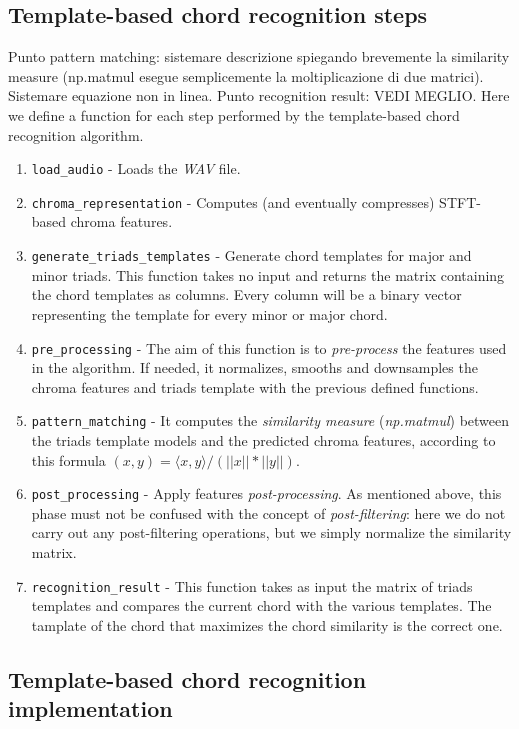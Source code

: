 \documentclass[
	12pt, %
]{fphw}
\begin{document}
\subsection*{Template-based chord recognition steps}

\color{red}
Punto pattern matching: sistemare descrizione spiegando brevemente la similarity measure (np.matmul esegue semplicemente la moltiplicazione di due matrici). Sistemare equazione non in linea.
Punto recognition result: VEDI MEGLIO.
\color{black}
Here we define a function for each step performed by the template-based chord recognition algorithm.

\begin{enumerate}
	\item \verb|load_audio| - Loads the \emph{WAV} file.
	\item \verb|chroma_representation| - Computes (and eventually compresses) STFT-based chroma features.
	\item \verb|generate_triads_templates| - Generate chord templates for major and minor triads. This function takes no input and returns the matrix containing the chord templates as columns. Every column will be a binary vector representing the template for every minor or major chord.
	\item \verb|pre_processing| - The aim of this function is to \emph{pre-process} the features used in the algorithm. If needed, it normalizes, smooths and downsamples the chroma features and triads template with the previous defined functions.
	\item \verb|pattern_matching| - It computes the \textit{similarity measure} (\textit{np.matmul}) between the triads template models and the predicted chroma features, according to this formula $(x,y)=\langle x,y\rangle/(||x||*||y||)$.
	\item \verb|post_processing| - Apply features \emph{post-processing}. As mentioned above, this phase must not be confused with the concept of \emph{post-filtering}: here we do not carry out any post-filtering operations, but we simply normalize the similarity matrix.
	\item \verb|recognition_result| - This function takes as input the matrix of triads templates and compares the current chord with the various templates. The tamplate of the chord that maximizes the chord similarity is the correct one.
\end{enumerate}

\subsection*{Template-based chord recognition implementation}
\end{document}
